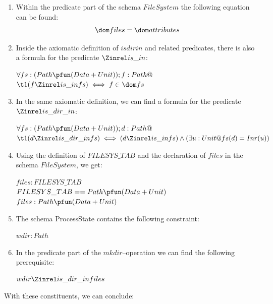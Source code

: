 \begin{enumerate}
%
%
\item Within the predicate part of the schema $FileSystem$ the following
  equation can be found:
\[
\dom files = \dom attributes
\]
%
%
\item Inside the axiomatic definition of $isdirin$ and related predicates, there
  is also a formula for the predicate $\isin$:
\begin{center}
$\forall fs : (Path \pfun (Data \pplus Unit)); f:Path @$\\%
$\t1 (f \isin fs) \iff f \in \dom fs$\\
\end{center}
%
%
\item In the same axiomatic definition, we can find a formula for the
  predicate $\isdirin$:
\begin{center}
$\forall fs: (Path \pfun (Data \pplus Unit)); d: Path @$ \\%
$\t1 (d \isdirin fs) \iff (d \isin fs) \land (\exists u: Unit @ fs(d) = Inr(u))$\\
\end{center}
%
%
\item Using the definition of $FILESYS\_TAB$ and the declaration of
  $files$ in the schema $FileSystem$, we get:
\begin{center}
$files : FILESYS\_TAB$\\
$FILESYS\_TAB == Path \pfun (Data \pplus Unit)$ \\
$files : Path \pfun (Data \pplus Unit)$
\end{center}
%
%
\item The schema ProcessState contains the following constraint:
\begin{center}
$wdir : Path$\\
\end{center}
%
%
\item In the predicate part of the $mkdir$--operation we can find the
  following prerequisite:
\begin{center}
$wdir \isdirin files$
\end{center}
\end{enumerate}

With these constituents, we can conclude:

